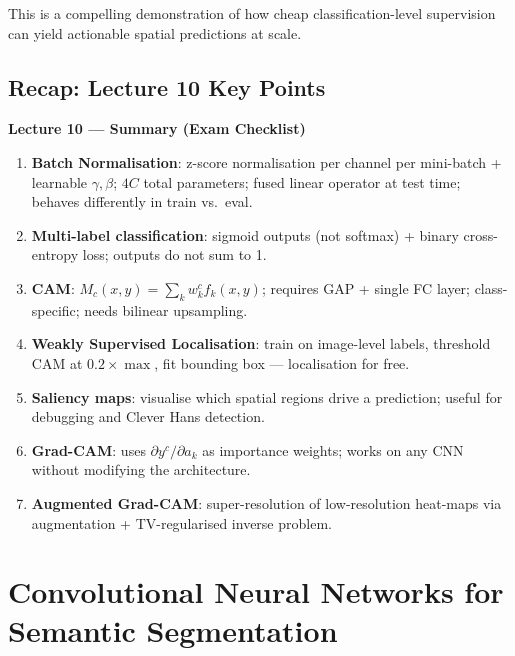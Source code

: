 \documentclass[11pt,a4paper]{article}
\begin{document}
This is a compelling demonstration of how cheap classification-level supervision can yield actionable spatial predictions at scale.

\subsection{Recap: Lecture 10 Key Points}

\begin{tcolorbox}[colback=WarningRedBg,colframe=WarningRed,boxrule=0.8pt,arc=3pt]
\textbf{Lecture 10 — Summary (Exam Checklist)}
\begin{enumerate}
  \item \textbf{Batch Normalisation}: z-score normalisation per channel per mini-batch + learnable $\gamma, \beta$; $4C$ total parameters; fused linear operator at test time; behaves differently in train vs.\ eval.
  \item \textbf{Multi-label classification}: sigmoid outputs (not softmax) + binary cross-entropy loss; outputs do not sum to 1.
  \item \textbf{CAM}: $M_c(x,y) = \sum_k w_k^c f_k(x,y)$; requires GAP + single FC layer; class-specific; needs bilinear upsampling.
  \item \textbf{Weakly Supervised Localisation}: train on image-level labels, threshold CAM at $0.2 \times \max$, fit bounding box — localisation for free.
  \item \textbf{Saliency maps}: visualise which spatial regions drive a prediction; useful for debugging and Clever Hans detection.
  \item \textbf{Grad-CAM}: uses $\partial y^c / \partial a_k$ as importance weights; works on any CNN without modifying the architecture.
  \item \textbf{Augmented Grad-CAM}: super-resolution of low-resolution heat-maps via augmentation + TV-regularised inverse problem.
\end{enumerate}
\end{tcolorbox}

\section{Convolutional Neural Networks for Semantic Segmentation}
\label{sec:semseg}
\end{document}
